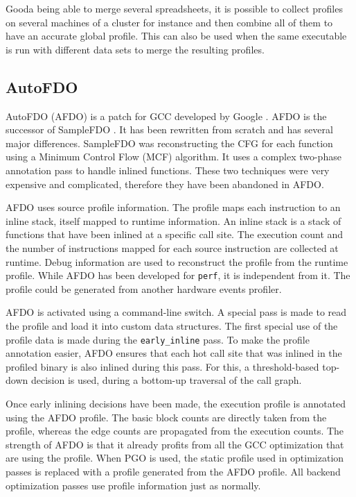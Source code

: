 \documentclass[9pt,english,twocolumn,letter]{article}
\begin{document}
Gooda being able to merge several spreadsheets, it is possible to collect profiles on several machines of a cluster for instance and then combine all of them to have an accurate global profile. This can also be used when the same executable is run with different data sets to merge the resulting profiles.

\subsection{AutoFDO}
\label{sec:afdo}

AutoFDO (AFDO)\cite{Chen2013} is a patch for GCC developed by Google
. AFDO is the successor of SampleFDO \cite{Chen2010}. It has been rewritten from scratch and has several major differences. SampleFDO was reconstructing the CFG for each function using a Minimum Control Flow (MCF) algorithm. It uses a complex two-phase annotation pass to handle inlined functions. These two techniques were very expensive and complicated, therefore they have been abandoned in AFDO.

AFDO uses source profile information. The profile maps each instruction to an inline stack, itself mapped to runtime information. An inline stack is a stack of functions that have been inlined at a specific call site. The execution count and the number of instructions mapped for each source instruction are collected at runtime. Debug information are used to reconstruct the profile from the runtime profile. While AFDO has been developed for \texttt{perf}, it is independent from it. The profile could be generated from another hardware events profiler.

AFDO is activated using a command-line switch. A special pass is made to read the profile and load it into custom data structures. The first special use of the profile data is made during the \texttt{early\_inline} pass. To make the profile annotation easier, AFDO ensures that each hot call site that was inlined in the profiled binary is also inlined during this pass. For this, a threshold-based top-down decision is used, during a bottom-up traversal of the call graph.

Once early inlining decisions have been made, the execution profile is annotated using the AFDO profile. The basic block counts are directly taken from the profile, whereas the edge counts are propagated from the execution counts. The strength of AFDO is that it already profits from all the GCC optimization that are using the profile. When PGO is used, the static profile used in optimization passes is replaced with a profile generated from the AFDO profile. All backend optimization passes use profile information just as normally.
\end{document}
